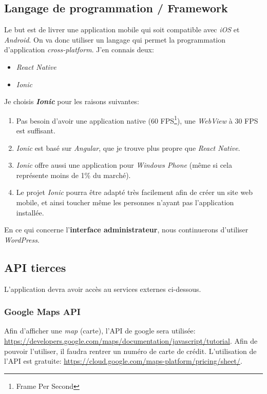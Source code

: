 \documentclass[french]{report}
\begin{document}
\subsection{Langage de programmation / Framework}
Le but est de livrer une application mobile qui soit compatible avec \textit{iOS}
et \textit{Android}. On va donc utiliser un langage qui permet la programmation
d'application \textit{cross-platform}. J'en connais deux:
\begin{itemize}
    \item \textit{React Native}
    \item \textit{Ionic}
\end{itemize}
Je choisis \textbf{\textit{Ionic}} pour les raisons suivantes:
\begin{enumerate}
    \item Pas besoin d'avoir une application native (60 FPS\footnote{Frame Per Second}),
    une \textit{WebView} à 30 FPS est suffisant.
    \item \textit{Ionic} est basé sur \textit{Angular}, que je trouve plus \og
    propre \fg{} que \textit{React Native}.
    \item \textit{Ionic} offre aussi une application pour \textit{Windows Phone} (même si
    cela représente moins de 1\% du marché).
    \item Le projet \textit{Ionic} pourra être adapté très facilement afin de créer
    un site web mobile, et ainsi toucher même les personnes n'ayant pas l'application
    installée.
\end{enumerate}
\vspace{1em}

En ce qui concerne l'\textbf{interface administrateur}, nous continuerons d'utiliser
\textit{WordPress}.


\subsection{API tierces}

L'application devra avoir accès au services externes ci-dessous.

\subsubsection{Google Maps API}

Afin d'afficher une \textit{map} (carte), l'API de google sera utilisée:
\url{https://developers.google.com/maps/documentation/javascript/tutorial}. Afin de
pouvoir l'utiliser, il faudra rentrer un numéro de carte de crédit. L'utilisation
de l'API est gratuite: \url{https://cloud.google.com/maps-platform/pricing/sheet/}. 
\end{document}
